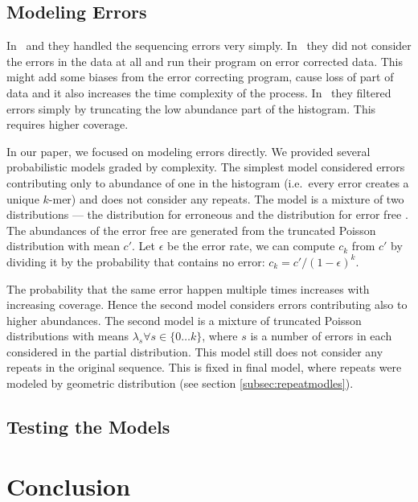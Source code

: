 \subsection{Modeling Errors}

In~\cite{waterman} and \cite{williams} they handled the sequencing errors very simply. In~\cite{waterman} they did not consider the errors in the data at all and run their program on error corrected data. This might add some biases from the error correcting program, cause loss of part of data and it also increases the time complexity of the process. In~\cite{williams} they filtered errors simply by truncating the low abundance part of the histogram. This requires higher coverage.

In our paper\cite{covest}, we focused on modeling errors directly. We provided several probabilistic models graded by complexity.
The simplest model considered errors contributing only to abundance of one in the histogram (i.e.\ every error creates a unique $k$-mer) and does not consider any repeats. The model is a mixture of two distributions --- the distribution for erroneous \kmers and the distribution for error free \kmers. The abundances of the error free \kmers are generated from the truncated Poisson distribution with mean $c'$. Let $\epsilon$ be the error rate, we can compute $c_k$ from $c'$ by dividing it by the probability that \kmer contains no error: $c_k = c'/{(1-\epsilon)}^k$.

The probability that the same error happen multiple times increases with increasing coverage. Hence the second model considers errors contributing also to higher abundances.
The second model is a mixture of truncated Poisson distributions with means $\lambda_s \forall s \in \{0\dots k\}$, where $s$ is a number of errors in each \kmer considered in the partial distribution. This model still does not consider any repeats in the original sequence.
This is fixed in final model, where repeats were modeled by geometric distribution (see section \ref{subsec:repeatmodles}).


\subsection{Testing the Models}


\section{Conclusion}

